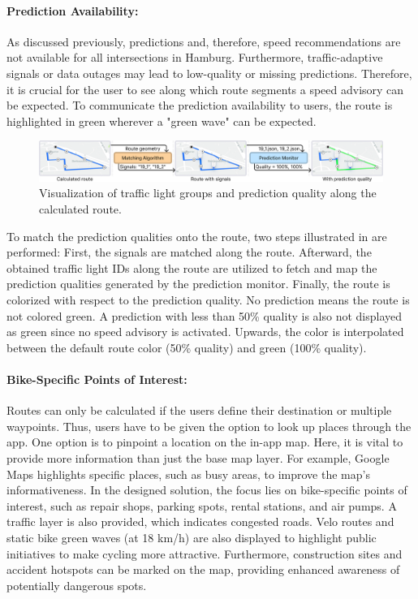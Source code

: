 \paragraph{Prediction Availability:} As discussed previously, predictions and, therefore, speed recommendations are not available for all intersections in Hamburg. Furthermore, traffic-adaptive signals or data outages may lead to low-quality or missing predictions. Therefore, it is crucial for the user to see along which route segments a speed advisory can be expected. To communicate the prediction availability to users, the route is highlighted in green wherever a "green wave" can be expected.

\begin{figure}[htbp]
\centering
\includegraphics[width=\linewidth]{images/routing-process-quality-mapping.png}
\caption{Visualization of traffic light groups and prediction quality along the calculated route.}
\label{fig:routing-process-quality-mapping}
\end{figure}

To match the prediction qualities onto the route, two steps illustrated in  are performed: First, the signals are matched along the route. Afterward, the obtained traffic light IDs along the route are utilized to fetch and map the prediction qualities generated by the prediction monitor. Finally, the route is colorized with respect to the prediction quality. No prediction means the route is not colored green. A prediction with less than 50\% quality is also not displayed as green since no speed advisory is activated. Upwards, the color is interpolated between the default route color (50\% quality) and green (100\% quality). 

\paragraph{Bike-Specific Points of Interest:} Routes can only be calculated if the users define their destination or multiple waypoints. Thus, users have to be given the option to look up places through the app. One option is to pinpoint a location on the in-app map. Here, it is vital to provide more information than just the base map layer. For example, Google Maps highlights specific places, such as busy areas, to improve the map's informativeness. In the designed solution, the focus lies on bike-specific points of interest, such as repair shops, parking spots, rental stations, and air pumps. A traffic layer is also provided, which indicates congested roads. Velo routes and static bike green waves (at 18 km/h) are also displayed to highlight public initiatives to make cycling more attractive. Furthermore, construction sites and accident hotspots can be marked on the map, providing enhanced awareness of potentially dangerous spots.

